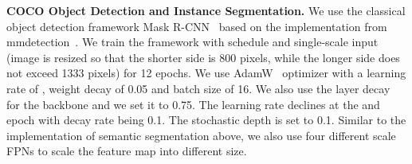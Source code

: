 \documentclass[runningheads]{llncs}
\begin{document}
\noindent \textbf{COCO Object Detection and Instance Segmentation.}
We use the classical object detection framework Mask R-CNN~\cite{he2017mask} based on the implementation from mmdetection~\cite{mmdetection}. We train the framework with  schedule and single-scale input (image is resized so that the shorter side is 800 pixels, while the longer side does not exceed 1333 pixels) for 12 epochs. We use AdamW~\cite{loshchilov2017decoupled} optimizer with a learning rate of , weight decay of 0.05 and batch size of 16. We also use the layer decay ~\cite{bao2021beit} for the backbone and we set it to 0.75. 
The learning rate declines at the  and  epoch with decay rate being 0.1. The stochastic depth is set to 0.1. 
Similar to the implementation of semantic segmentation above, we also use four different scale FPNs to scale the feature map into different size.
\end{document}
